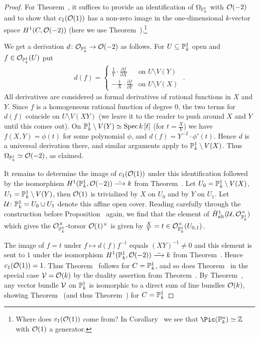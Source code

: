 \documentclass[a4paper,parskip=half,numbers=enddot, DIV=12]{scrreprt}
\begin{document}
\begin{proof}
	For Theorem~, it suffices to provide an identification of $\Omega_{\mathbb{P}_k^1}$ with $\mathcal{O}(-2)$ and to show that $c_1(\mathcal{O}(1))$ has a non-zero image in the one-dimensional $k$-vector space $H^1(C,\mathcal{O}(-2))$ (here we use Theorem~).\footnote{Where does $c_1(\mathcal{O}(1))$ come from? In Corollary~ we see that $\Pic(\IP_k^n)\simeq \IZ$ with $\mathcal{O}(1)$ a generator.}
	
	We get a derivation $d\colon \Oo_{\IP_k^1}\morphism\Oo(-2)$ as follows. For $U\subseteq \mathbb{P}_k^1$ open and $f\in\mathcal{O}_{\mathbb{P}_k^1}(U)$ put
	\begin{align*}
	d(f)=\begin{cases}
	\frac{1}{Y}\cdot\frac{\partial f}{\partial X} & \text{on }U\setminus V(Y)\\
	-\frac{1}{X}\cdot\frac{\partial f}{\partial Y} & \text{on }U\setminus V(X)
	\end{cases}\;.
	\end{align*}
	All derivatives are considered as formal derivatives of rational functions in $X$ and $Y$. Since $f$ is a homogeneous rational function of degree $0$, the two terms for $d(f)$ coincide on $U\setminus V(XY)$ (we leave it to the reader to push around $X$ and $Y$ until this comes out). On $\mathbb{P}_k^1\setminus V(Y)\simeq \operatorname{Spec} k\left[t\right]$ (for $t=\frac{X}{Y}$) we have $f(X,Y)=\phi\left(t\right)$ for some polynomial $\phi$, and $d(f)=Y^{-2}\cdot \phi'\left(t\right)$. Hence $d$ is a universal derivation there, and similar arguments apply to $\mathbb{P}_k^1\setminus V(X)$. Thus $\Omega_{\mathbb{P}_k^1}\simeq \mathcal{O}(-2)$, as claimed.
	
	It remains to determine the image of $c_1(\mathcal{O}(1))$ under this identification followed by the isomorphism $H^1(\IP_k^1,\Oo(-2))\isomorphism k$ from Theorem~. Let $U_0=\mathbb{P}_k^1\setminus V(X)$, $U_1=\mathbb{P}_k^1\setminus V(Y)$, then $\mathcal{O}(1)$ is trivialized by $X$ on $U_0$ and by $Y$ on $U_1$. Let $\mathcal{U}\colon \mathbb{P}_k^1=U_0\cup U_1$ denote this affine open cover. Reading carefully through the construction before Proposition~ again, we find that the element of $\check{H}_{\mathrm{alt}}^1(\mathcal{U},\mathcal{O}_{\mathbb{P}_k^1}^\times)$ which gives the $\mathcal{O}_{\mathbb{P}_k^1}^\times$-torsor $\mathcal{O}(1)^\times$ is given by $\frac{X}{Y}=t\in\mathcal{O}_{\mathbb{P}_k^1}^\times(U_{0,1})$.
	
	The image of $f=t$ under $f\mapsto d(f)f^{-1}$ equals $(XY)^{-1}\neq 0$ and this element is sent to $1$ under the isomorphism $H^1(\IP_k^1,\Oo(-2))\isomorphism k$ from Theorem~. Hence $c_1(\mathcal{O}(1))=1$. Thus Theorem~ follows for $C=\mathbb{P}_k^1$, and so does Theorem~ in the special case $\mathcal{V}=\mathcal{O}(k)$ by the duality assertion from Theorem~. By Theorem~, any vector bundle $\mathcal{V}$ on $\mathbb{P}_k^1$ is isomorphic to a direct sum of line bundles $\mathcal{O}(k)$, showing Theorem~ (and thus Theorem~) for $C=\mathbb{P}_k^1$
\end{proof}
\end{document}
